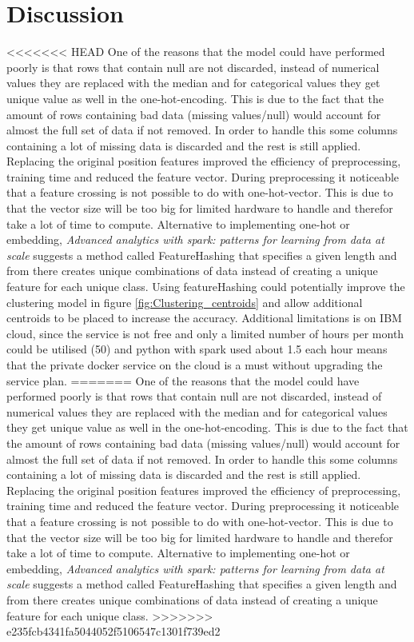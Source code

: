 \documentclass[../main.tex]{subfiles}
\begin{document}
\section{Discussion}
<<<<<<< HEAD
One of the reasons that the model could have performed poorly is that rows that contain null are not discarded, instead of numerical values they are replaced with the median and for categorical values they get unique value as well in the one-hot-encoding. This is due to the fact that the amount of rows containing bad data (missing values/null) would account for almost the full set of data if not removed. In order to handle this some columns containing a lot of missing data is discarded and the rest is still applied. Replacing the original position features improved the efficiency of preprocessing, training time and reduced the feature vector. During preprocessing it noticeable that a feature crossing is not possible to do with one-hot-vector. This is due to that the vector size will be too big for limited hardware to handle and therefor take a lot of time to compute. Alternative to implementing one-hot or embedding, \textit{Advanced analytics with spark: patterns for learning from data at scale} \cite{ryza2017advanced} suggests a method called FeatureHashing that specifies a given length and from there creates unique combinations of data instead of creating a unique feature for each unique class. Using featureHashing could potentially improve the clustering model in figure \ref{fig:Clustering_centroids} and allow additional centroids to be placed to increase the accuracy. Additional limitations is on IBM cloud, since the service is not free and only a limited number of hours per month could be utilised (50) and python with spark used about 1.5 each hour means that the private docker service on the cloud is a must without upgrading the service plan.
=======
One of the reasons that the model could have performed poorly is that rows that contain null are not discarded, instead of numerical values they are replaced with the median and for categorical values they get unique value as well in the one-hot-encoding. This is due to the fact that the amount of rows containing bad data (missing values/null) would account for almost the full set of data if not removed. In order to handle this some columns containing a lot of missing data is discarded and the rest is still applied. Replacing the original position features improved the efficiency of preprocessing, training time and reduced the feature vector. During preprocessing it noticeable that a feature crossing is not possible to do with one-hot-vector. This is due to that the vector size will be too big for limited hardware to handle and therefor take a lot of time to compute. Alternative to implementing one-hot or embedding, \textit{Advanced analytics with spark: patterns for learning from data at scale} \cite{ryza2017advanced} suggests a method called FeatureHashing that specifies a given length and from there creates unique combinations of data instead of creating a unique feature for each unique class.
>>>>>>> e235fcb4341fa5044052f5106547c1301f739ed2
\end{document}
